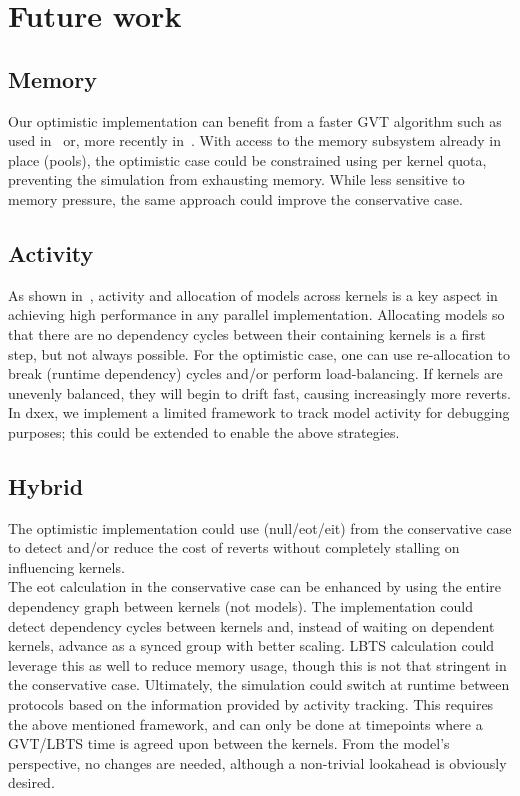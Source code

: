 

\section{Future work}
\subsection{Memory}
Our optimistic implementation can benefit from a faster GVT algorithm such
 as used in~\cite{Fujimoto:1997:CGV:268403.268404}  or, more recently in~\cite{Bauer:2005:SND:1069810.1070159}. 
With access to the memory subsystem already in place (pools), the optimistic case could be constrained using per kernel quota, preventing the simulation from exhausting memory. While less sensitive to memory pressure, the same approach could improve the conservative case.
\subsection{Activity}
As shown in~\cite{PythonPDEVS_ACTIMS}, activity and allocation of models across kernels is a key aspect in achieving high performance in any parallel implementation. Allocating models so that there are no dependency cycles between their containing kernels is a first step, but not always possible. For the optimistic case, one can use re-allocation to break (runtime dependency) cycles and/or perform load-balancing. If kernels are unevenly balanced, they will begin to drift fast, causing increasingly more reverts. In dxex, we implement a limited framework to track model activity for debugging purposes; this could be extended to enable the above strategies.
\subsection{Hybrid}
The optimistic implementation could use (null/eot/eit) from the conservative case to detect and/or reduce the cost of reverts without completely stalling on influencing kernels.\\
The eot calculation in the conservative case can be enhanced by using the entire dependency graph between kernels (not models). The implementation could detect dependency cycles between kernels and, instead of waiting on dependent kernels, advance as a synced group with better scaling. LBTS calculation could leverage this as well to reduce memory usage, though this is not that stringent in the conservative case.
Ultimately, the simulation could switch at runtime between protocols based on the information provided by activity tracking. This requires the above mentioned framework, and can only be done at timepoints where a GVT/LBTS time is agreed upon between the kernels. From the model's perspective, no changes are needed, although a non-trivial lookahead is obviously desired. 

